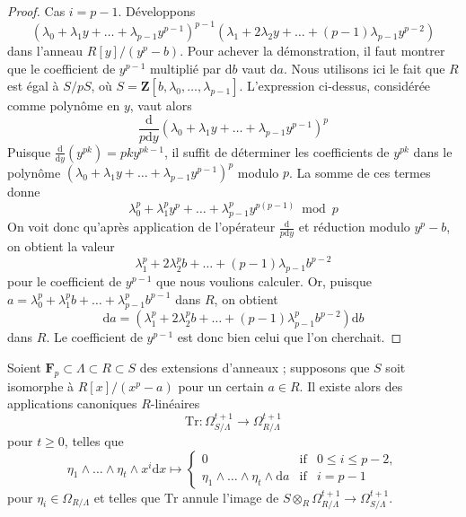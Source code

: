 \begin{proof}
\medskip\noindent Cas $i = p - 1$. Développons $$
(\lambda_0 + \lambda_1 y + \ldots + \lambda_{p - 1}y^{p - 1})^{p - 1}
(\lambda_1 + 2 \lambda_2 y + \ldots + (p - 1)\lambda_{p - 1}y^{p - 2})
$$ dans l'anneau $R[y]/(y^p - b)$. Pour achever la démonstration, il faut montrer que le coefficient de $y^{p - 1}$ multiplié par $\text{d}b$ vaut $\text{d}a$. Nous utilisons ici le fait que $R$ est égal à $S/pS$, où $S = \mathbf{Z}[b, \lambda_0, \ldots, \lambda_{p - 1}]$. L'expression ci-dessus, considérée comme polynôme en $y$, vaut alors $$
\frac{\text{d}}{p\text{d}y}
(\lambda_0 + \lambda_1 y + \ldots + \lambda_{p - 1}y^{p - 1})^p
$$ Puisque $\frac{\text{d}}{\text{d}y}(y^{pk}) = pk y^{pk - 1}$, il suffit de déterminer les coefficients de $y^{pk}$ dans le polynôme $(\lambda_0 + \lambda_1 y + \ldots + \lambda_{p - 1}y^{p - 1})^p$ modulo $p$. La somme de ces termes donne $$
\lambda_0^p + \lambda_1^py^p + \ldots + \lambda_{p - 1}^py^{p(p - 1)}
\bmod p
$$ On voit donc qu'après application de l'opérateur $\frac{\text{d}}{p\text{d}y}$ et réduction modulo $y^p - b$, on obtient la valeur $$
\lambda_1^p + 2\lambda_2^pb + \ldots + (p - 1)\lambda_{p - 1}b^{p - 2}
$$ pour le coefficient de $y^{p - 1}$ que nous voulions calculer. Or, puisque $a = \lambda_0^p + \lambda_1^p b + \ldots + \lambda_{p - 1}^pb^{p - 1}$ dans $R$, on obtient $$
\text{d}a = (\lambda_1^p  + 2 \lambda_2^p b + \ldots +
(p - 1) \lambda_{p - 1}^p b^{p - 2}) \text{d}b
$$ dans $R$. Le coefficient de $y^{p - 1}$ est donc bien celui que l'on cherchait. \end{proof}

\begin{lemma} \label{lemma-trace-higher} Soient $\mathbf{F}_p \subset \Lambda \subset R \subset S$ des extensions d'anneaux ; supposons que $S$ soit isomorphe à $R[x]/(x^p - a)$ pour un certain $a \in R$. Il existe alors des applications canoniques $R$-linéaires $$
\text{Tr} :
\Omega^{t + 1}_{S/\Lambda}
\longrightarrow
\Omega_{R/\Lambda}^{t + 1}
$$ pour $t \geq 0$, telles que $$
\eta_1 \wedge \ldots \wedge \eta_t \wedge x^i\text{d}x
\longmapsto
\left\{
\begin{matrix}
0 & \text{if} & 0 \leq i \leq p - 2, \\
\eta_1 \wedge \ldots \wedge \eta_t \wedge \text{d}a & \text{if} & i = p - 1
\end{matrix}
\right.
$$ pour $\eta_i \in \Omega_{R/\Lambda}$ et telles que $\text{Tr}$ annule l'image de $S \otimes_R \Omega_{R/\Lambda}^{t + 1} \to \Omega_{S/\Lambda}^{t + 1}$. \end{lemma}

